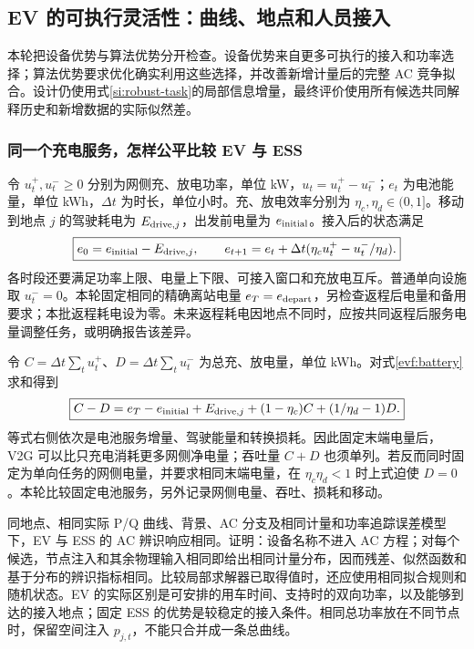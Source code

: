 \subsection{EV 的可执行灵活性：曲线、地点和人员接入}
\label{evf:flexibility}

本轮把设备优势与算法优势分开检查。设备优势来自更多可执行的接入和功率选择；算法优势要求优化确实利用这些选择，并改善新增计量后的完整 AC 竞争拟合。设计仍使用式\eqref{si:robust-task}的局部信息增量，最终评价使用所有候选共同解释历史和新增数据的实际似然差。

\subsubsection{同一个充电服务，怎样公平比较 EV 与 ESS}

令 $u_t^+,u_t^-\ge0$ 分别为网侧充、放电功率，单位 kW，$u_t=u_t^+-u_t^-$；$e_t$ 为电池能量，单位 kWh，$\Delta t$ 为时长，单位小时。充、放电效率分别为 $\eta_c,\eta_d\in(0,1]$。移动到地点 $j$ 的驾驶耗电为 $E_{{\rm drive},j}$，出发前电量为 $e_{\rm initial}$。接入后的状态满足
\begin{equation}
 \boxed{e_0=e_{\rm initial}-E_{{\rm drive},j},\qquad
 e_{t+1}=e_t+\Delta t(\eta_cu_t^+-u_t^-/\eta_d).}
 \label{evf:battery}
\end{equation}
各时段还要满足功率上限、电量上下限、可接入窗口和充放电互斥。普通单向设施取 $u_t^-=0$。本轮固定相同的精确离站电量 $e_T=e_{\rm depart}$，另检查返程后电量和备用要求；本批返程耗电设为零。未来返程耗电因地点不同时，应按共同返程后服务电量调整任务，或明确报告该差异。

令 $C=\Delta t\sum_tu_t^+$、$D=\Delta t\sum_tu_t^-$ 为总充、放电量，单位 kWh。对式\eqref{evf:battery}求和得到
\begin{equation}
 \boxed{C-D=e_T-e_{\rm initial}+E_{{\rm drive},j}
 +(1-\eta_c)C+(1/\eta_d-1)D.}
 \label{evf:energy-account}
\end{equation}
等式右侧依次是电池服务增量、驾驶能量和转换损耗。因此固定末端电量后，V2G 可以比只充电消耗更多网侧净电量；吞吐量 $C+D$ 也须单列。若反而同时固定为单向任务的网侧电量，并要求相同末端电量，在 $\eta_c\eta_d<1$ 时上式迫使 $D=0$。本轮比较固定电池服务，另外记录网侧电量、吞吐、损耗和移动。

同地点、相同实际 P/Q 曲线、背景、AC 分支及相同计量和功率追踪误差模型下，EV 与 ESS 的 AC 辨识响应相同。证明：设备名称不进入 AC 方程；对每个候选，节点注入和其余物理输入相同即给出相同计量分布，因而残差、似然函数和基于分布的辨识指标相同。比较局部求解器已取得值时，还应使用相同拟合规则和随机状态。EV 的实际区别是可安排的用车时间、支持时的双向功率，以及能够到达的接入地点；固定 ESS 的优势是较稳定的接入条件。相同总功率放在不同节点时，保留空间注入 $p_{j,t}$，不能只合并成一条总曲线。

